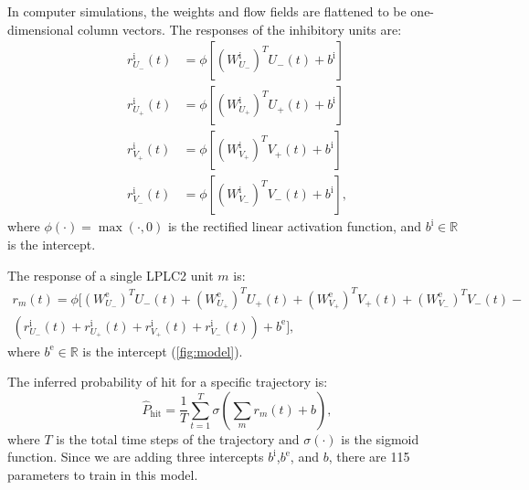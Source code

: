 \documentclass[9pt,lineno]{elife}
\let\hat\widehat
\begin{document}

In computer simulations, the weights and flow fields are flattened to be one-dimensional column vectors. The responses of the inhibitory units are:
\begin{align*}
r^{\text{i}}_{U_{-}}(t) &= \phi \left[ (W^{\text{i}}_{U_{-}})^{T}U_{-}(t)+b^{\text{i}} \right] \nonumber \\
r^{\text{i}}_{U_{+}}(t) &= \phi \left[ (W^{\text{i}}_{U_{+}})^{T}U_{+}(t)+b^{\text{i}} \right] \nonumber \\
r^{\text{i}}_{V_{+}}(t) &= \phi \left[ (W^{\text{i}}_{V_{+}})^{T}V_{+}(t)+b^{\text{i}} \right] \nonumber \\
r^{\text{i}}_{V_{-}}(t) &= \phi \left[ (W^{\text{i}}_{V_{-}})^{T}V_{-}(t)+b^{\text{i}} \right],
\end{align*}
where $\phi(\cdot) = \max(\cdot,0)$ is the rectified linear activation function, and $b^{\text{i}} \in \mathbb{R}$ is the intercept.

The response of a single LPLC2 unit $m$ is:
\begin{multline}\label{eq:LPLC2_response}
r_{m}(t) = \phi \Bigg[ (W^{\text{e}}_{U_{-}})^{T}U_{-}(t)+(W^{\text{e}}_{U_{+}})^{T}U_{+}(t)+(W^{\text{e}}_{V_{+}})^{T}V_{+}(t)+(W^{\text{e}}_{V_{-}})^{T}V_{-}(t)- \\
\left(r^{\text{i}}_{U_{-}}(t)+r^{\text{i}}_{U_{+}}(t)+r^{\text{i}}_{V_{+}}(t)+r^{\text{i}}_{V_{-}}(t)\right)+b^{\text{e}} \Bigg],
\end{multline}
where $b^{\text{e}} \in \mathbb{R}$ is the intercept (\ref{fig:model}).

The inferred probability of hit for a specific trajectory is:
\begin{equation}
\hat{P}_{\text{hit}} =\frac{1}{T}\sum_{t=1}^{T} \sigma \left( \sum_{m}r_{m}(t)+b \right),
\label{eq:prob_model}
\end{equation}
where $T$ is the total time steps of the trajectory and $\sigma(\cdot)$ is the sigmoid function. Since we are adding three intercepts $b^{\text{i}}$,$b^{\text{e}}$, and $b$, there are 115 parameters to train in this model.
\end{document}
